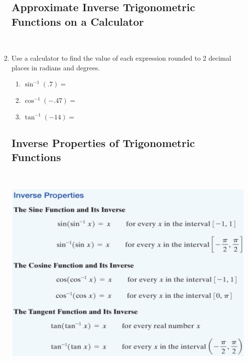 \begin{enumerate}
\begin{enumerate}
\end{enumerate}


\subsection{Approximate Inverse Trigonometric Functions on a Calculator} ~

\item Use a calculator to find the value of each expression rounded to 2 decimal places in radians and degrees.
\begin{enumerate}
\item $\sin^{-1}(.7)=$\\
\item $\cos^{-1}(-.47)=$\\
\item $\tan^{-1}(-14)=$\\
\end{enumerate}


\newpage

\subsection{Inverse Properties of Trigonometric Functions} ~

\includegraphics[scale=.7]{inverseprops}


\end{enumerate}
